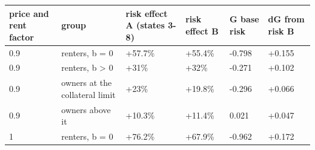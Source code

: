 \begingroup\small
\setlength{\tabcolsep}{3pt}
\renewcommand{\arraystretch}{1.04}
\begin{tabularx}{\linewidth}{XXXXXX}
\toprule
price and rent factor & group & risk effect A (states 3-8) & risk effect B & G base risk & dG from risk B \\
\midrule
0.9 & renters, b = 0 & +57.7\% & +55.4\% & -0.798 & +0.155 \\
0.9 & renters, b \textgreater{} 0 & +31\% & +32\% & -0.271 & +0.102 \\
0.9 & owners at the collateral limit & +23\% & +19.8\% & -0.296 & +0.066 \\
0.9 & owners above it & +10.3\% & +11.4\% & 0.021 & +0.047 \\
1 & renters, b = 0 & +76.2\% & +67.9\% & -0.962 & +0.172 \\
\bottomrule
\end{tabularx}
\endgroup
